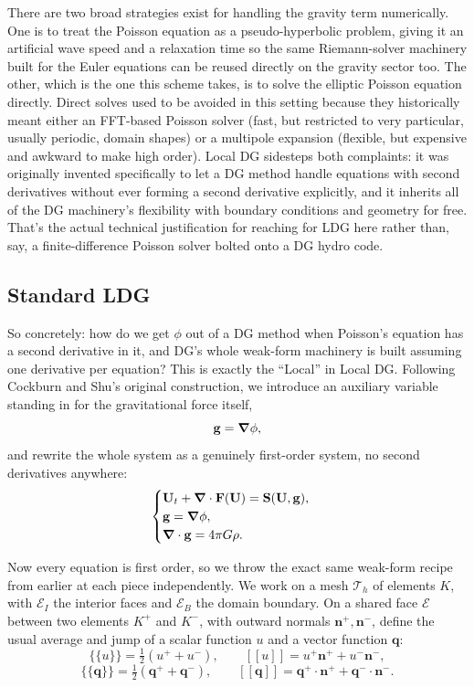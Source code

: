 There are two broad strategies exist for handling the gravity term numerically. One is to treat the Poisson equation as a pseudo-hyperbolic problem, giving it an artificial wave speed and a relaxation time so the same Riemann-solver machinery built for the Euler equations can be reused directly on the gravity sector too. The other, which is the one this scheme takes, is to solve the elliptic Poisson equation directly. Direct solves used to be avoided in this setting because they historically meant either an FFT-based Poisson solver (fast, but restricted to very particular, usually periodic, domain shapes) or a multipole expansion (flexible, but expensive and awkward to make high order). Local DG sidesteps both complaints: it was originally invented specifically to let a DG method handle equations with second derivatives without ever forming a second derivative explicitly, and it inherits all of the DG machinery's flexibility with boundary conditions and geometry for free. That's the actual technical justification for reaching for LDG here rather than, say, a finite-difference Poisson solver bolted onto a DG hydro code.

\subsection{Standard LDG}

So concretely: how do we get $\phi$ out of a DG method when Poisson's equation has a second derivative in it, and DG's whole weak-form machinery is built assuming one derivative per equation? This is exactly the ``Local'' in Local DG. Following Cockburn and Shu's original construction, we introduce an auxiliary variable standing in for the gravitational force itself,
\[
	\mathbf{g} = \grad \phi,
\]
and rewrite the whole system as a genuinely first-order system, no second derivatives anywhere:
\[
	\begin{cases}
		\mathbf{U}_t + \grad\cdot\mathbf{F}(\mathbf{U}) = \mathbf{S}(\mathbf{U}, \mathbf{g}), \\
		\mathbf{g} = \grad\phi,                                                               \\
		\grad\cdot\mathbf{g} = 4\pi G \rho.
	\end{cases}
\]

Now every equation is first order, so we throw the exact same weak-form recipe from earlier at each piece independently. We work on a mesh $\mathcal{T}_h$ of elements $K$, with $\mathcal{E}_I$ the interior faces and $\mathcal{E}_B$ the domain boundary. On a shared face $\mathcal{E}$ between two elements $K^+$ and $K^-$, with outward normals $\mathbf{n}^+,\mathbf{n}^-$, define the usual average and jump of a scalar function $u$ and a vector function $\mathbf{q}$:
\[
	\{\!\{u\}\!\} = \tfrac12(u^+ + u^-), \qquad [\![u]\!] = u^+\mathbf{n}^+ + u^-\mathbf{n}^-,
\]
\[
	\{\!\{\mathbf{q}\}\!\} = \tfrac12(\mathbf{q}^+ + \mathbf{q}^-), \qquad [\![\mathbf{q}]\!] = \mathbf{q}^+\cdot\mathbf{n}^+ + \mathbf{q}^-\cdot\mathbf{n}^-.
\]

